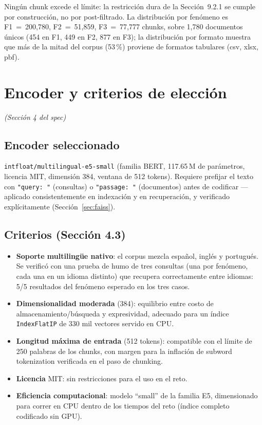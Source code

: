 \documentclass[11pt]{article}
\newcommand{\codigo}[1]{\texttt{\small #1}}
\newcommand{\seccionspec}[1]{\textit{(Sección #1 del spec)}}
\begin{document}
Ningún chunk excede el límite: la restricción dura de la Sección~9.2.1 se
cumple por construcción, no por post-filtrado. La distribución por fenómeno
es F1~=~200{,}780, F2~=~51{,}859, F3~=~77{,}777 chunks, sobre 1{,}780
documentos únicos (454 en F1, 449 en F2, 877 en F3); la distribución por
formato muestra que más de la mitad del corpus (53\,\%) proviene de formatos
tabulares (csv, xlsx, pbf).

\section{Encoder y criterios de elección}
\seccionspec{4}

\subsection{Encoder seleccionado}

\codigo{intfloat/multilingual-e5-small} (familia BERT, 117.65\,M de
parámetros, licencia MIT, dimensión 384, ventana de 512 tokens). Requiere
prefijar el texto con
\codigo{"query: "} (consultas) o \codigo{"passage: "} (documentos) antes de
codificar --- aplicado consistentemente en indexación y en recuperación, y
verificado explícitamente (Sección~\ref{sec:faiss}).

\subsection{Criterios (Sección 4.3)}

\begin{itemize}
\item \textbf{Soporte multilingüe nativo}: el corpus mezcla español, inglés y
portugués. Se verificó con una prueba de humo de tres consultas (una por
fenómeno, cada una en un idioma distinto) que recupera correctamente entre
idiomas: 5/5 resultados del fenómeno esperado en los tres casos.
\item \textbf{Dimensionalidad moderada} (384): equilibrio entre costo de
almacenamiento/búsqueda y expresividad, adecuado para un índice
\codigo{IndexFlatIP} de 330 mil vectores servido en CPU.
\item \textbf{Longitud máxima de entrada} (512 tokens): compatible con el
límite de 250 palabras de los chunks, con margen para la inflación de
subword tokenization verificada en el paso de chunking.
\item \textbf{Licencia} MIT: sin restricciones para el uso en el reto.
\item \textbf{Eficiencia computacional}: modelo ``small'' de la familia E5,
dimensionado para correr en CPU dentro de los tiempos del reto (índice
completo codificado sin GPU).
\end{itemize}
\end{document}
